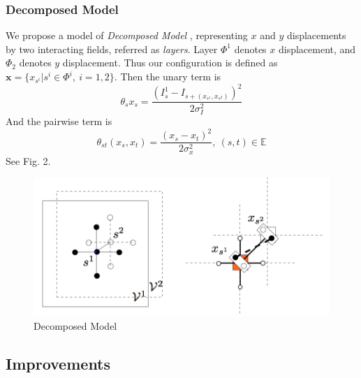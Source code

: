 \documentclass{article} %
\begin{document}
	\subsubsection{Decomposed Model} We propose a model of \emph{Decomposed Model} \cite{kovtun2004image}, representing $x$ and $y$ displacements by two interacting fields, referred as \emph{layers}. Layer $\Phi^1$ denotes $x$ displacement, and $\Phi_2$ denotes $y$ displacement. Thus our configuration is defined as $\mathbf{x} = \{x_{s^i}|s^i\in\Phi^i,\ i = 1,2\}$. Then the unary term is
	\begin{equation}
		\theta_s{x_s} = \frac{\left(I_s^1 - I_{s+(x_{s^1}, x_{s^2})}\right)^2}{2\sigma_I^2}
	\end{equation}
	And the pairwise term is
	\begin{equation}
		\theta_{st}\left(x_s, x_t\right) = \frac{\left(x_s - x_t\right)^2}{2\sigma_x^2},\ (s,t)\in\mathbb{E}
	\end{equation}
	See Fig. 2.
	\begin{figure}[!hb]
	\centering
	\includegraphics[scale=0.7]{decompose.png}
	\caption{Decomposed Model}
	\end{figure}
	\subsection{Improvements}
\end{document}
